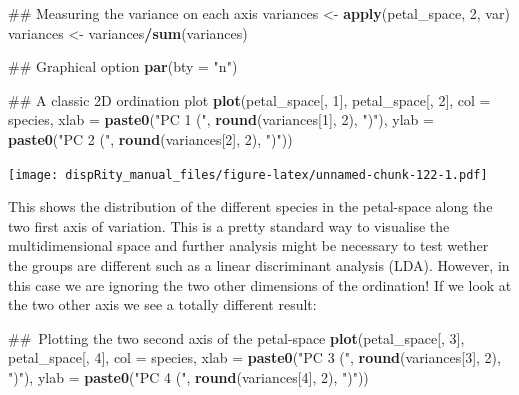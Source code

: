 \documentclass[]{book}
\newenvironment{Shaded}{\begin{snugshade}}{\end{snugshade}}
\newcommand{\KeywordTok}[1]{\textcolor[rgb]{0.13,0.29,0.53}{\textbf{#1}}}
\newcommand{\DataTypeTok}[1]{\textcolor[rgb]{0.13,0.29,0.53}{#1}}
\newcommand{\DecValTok}[1]{\textcolor[rgb]{0.00,0.00,0.81}{#1}}
\newcommand{\StringTok}[1]{\textcolor[rgb]{0.31,0.60,0.02}{#1}}
\newcommand{\OperatorTok}[1]{\textcolor[rgb]{0.81,0.36,0.00}{\textbf{#1}}}
\newcommand{\NormalTok}[1]{#1}
\theoremstyle{definition}
\theoremstyle{definition}
\theoremstyle{definition}
\theoremstyle{remark}
\begin{document}
\begin{Shaded}
\begin{Highlighting}[]
\NormalTok{## Measuring the variance on each axis}
\NormalTok{variances <-}\StringTok{ }\KeywordTok{apply}\NormalTok{(petal_space, }\DecValTok{2}\NormalTok{, var)}
\NormalTok{variances <-}\StringTok{ }\NormalTok{variances}\OperatorTok{/}\KeywordTok{sum}\NormalTok{(variances)}

\NormalTok{## Graphical option}
\KeywordTok{par}\NormalTok{(}\DataTypeTok{bty =} \StringTok{"n"}\NormalTok{)}

\NormalTok{## A classic 2D ordination plot}
\KeywordTok{plot}\NormalTok{(petal_space[, }\DecValTok{1}\NormalTok{], petal_space[, }\DecValTok{2}\NormalTok{], }\DataTypeTok{col =}\NormalTok{ species,}
    \DataTypeTok{xlab =} \KeywordTok{paste0}\NormalTok{(}\StringTok{"PC 1 ("}\NormalTok{, }\KeywordTok{round}\NormalTok{(variances[}\DecValTok{1}\NormalTok{], }\DecValTok{2}\NormalTok{), }\StringTok{")"}\NormalTok{),}
    \DataTypeTok{ylab =} \KeywordTok{paste0}\NormalTok{(}\StringTok{"PC 2 ("}\NormalTok{, }\KeywordTok{round}\NormalTok{(variances[}\DecValTok{2}\NormalTok{], }\DecValTok{2}\NormalTok{), }\StringTok{")"}\NormalTok{))}
\end{Highlighting}
\end{Shaded}

\texttt{[image: dispRity\_manual\_files/figure-latex/unnamed-chunk-122-1.pdf]}

This shows the distribution of the different species in the petal-space
along the two first axis of variation. This is a pretty standard way to
visualise the multidimensional space and further analysis might be
necessary to test wether the groups are different such as a linear
discriminant analysis (LDA). However, in this case we are ignoring the
two other dimensions of the ordination! If we look at the two other axis
we see a totally different result:

\begin{Shaded}
\begin{Highlighting}[]
\NormalTok{## Plotting the two second axis of the petal-space}
\KeywordTok{plot}\NormalTok{(petal_space[, }\DecValTok{3}\NormalTok{], petal_space[, }\DecValTok{4}\NormalTok{], }\DataTypeTok{col =}\NormalTok{ species,}
    \DataTypeTok{xlab =} \KeywordTok{paste0}\NormalTok{(}\StringTok{"PC 3 ("}\NormalTok{, }\KeywordTok{round}\NormalTok{(variances[}\DecValTok{3}\NormalTok{], }\DecValTok{2}\NormalTok{), }\StringTok{")"}\NormalTok{),}
    \DataTypeTok{ylab =} \KeywordTok{paste0}\NormalTok{(}\StringTok{"PC 4 ("}\NormalTok{, }\KeywordTok{round}\NormalTok{(variances[}\DecValTok{4}\NormalTok{], }\DecValTok{2}\NormalTok{), }\StringTok{")"}\NormalTok{))}
\end{Highlighting}
\end{Shaded}
\end{document}
